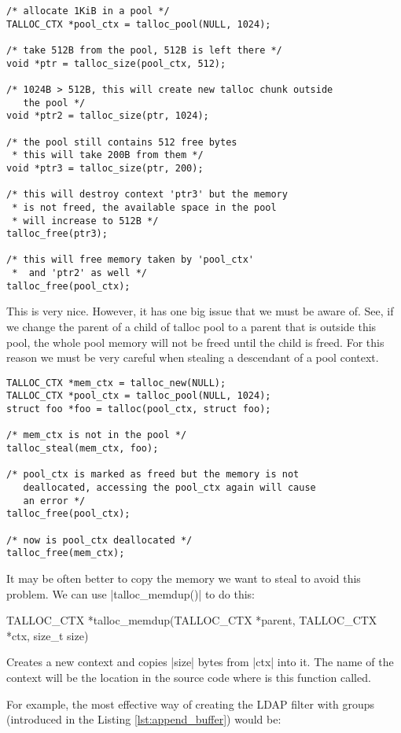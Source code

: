 \begin{lstlisting}[caption={Talloc pool},label=lst:talloc_pool,
morekeywords={talloc_pool}]
/* allocate 1KiB in a pool */
TALLOC_CTX *pool_ctx = talloc_pool(NULL, 1024);

/* take 512B from the pool, 512B is left there */
void *ptr = talloc_size(pool_ctx, 512);

/* 1024B > 512B, this will create new talloc chunk outside
   the pool */
void *ptr2 = talloc_size(ptr, 1024);

/* the pool still contains 512 free bytes
 * this will take 200B from them */
void *ptr3 = talloc_size(ptr, 200);

/* this will destroy context 'ptr3' but the memory
 * is not freed, the available space in the pool
 * will increase to 512B */
talloc_free(ptr3);

/* this will free memory taken by 'pool_ctx'
 *  and 'ptr2' as well */
talloc_free(pool_ctx);
\end{lstlisting}

\noindent
This is very nice. However, it has one big issue that we must be aware of. See,
if we change the parent of a child of talloc pool to a parent that is outside
this pool, the whole pool memory will not be freed until the child is freed.
For this reason we must be very careful when stealing a descendant of a pool
context.

\begin{lstlisting}[caption={Stealing from pool context},
morekeywords={talloc_pool,talloc_steal,talloc_free}]
TALLOC_CTX *mem_ctx = talloc_new(NULL);
TALLOC_CTX *pool_ctx = talloc_pool(NULL, 1024);
struct foo *foo = talloc(pool_ctx, struct foo);

/* mem_ctx is not in the pool */
talloc_steal(mem_ctx, foo);

/* pool_ctx is marked as freed but the memory is not
   deallocated, accessing the pool_ctx again will cause
   an error */
talloc_free(pool_ctx);

/* now is pool_ctx deallocated */
talloc_free(mem_ctx);
\end{lstlisting}

\noindent
It may be often better to copy the memory we want to steal to avoid this
problem. We can use |talloc_memdup()| to do this:

\begin{funcproto}
TALLOC_CTX *talloc_memdup(TALLOC_CTX *parent,
                          TALLOC_CTX *ctx, size_t size)
\end{funcproto}
\begin{funcdesc}
Creates a new context and copies |size| bytes from |ctx| into it. The name of
the context will be the location in the source code where is this function
called.
\end{funcdesc}
\funclistend
For example, the most effective way of creating the LDAP filter with groups
(introduced in the Listing \ref{lst:append_buffer}) would be:

